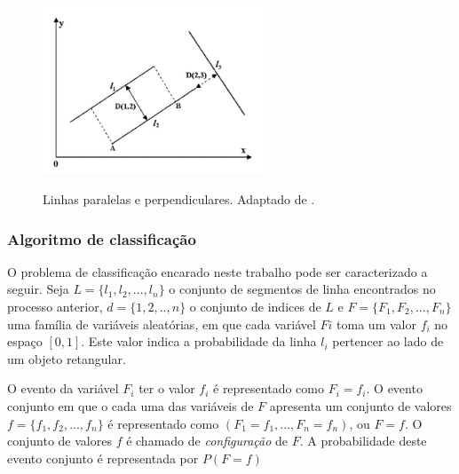 
\begin{figure} [h]
\centering
\includegraphics[width = 0.6\textwidth]{figuras/linhasparal.jpg} \label{uelinha} \caption{Linhas paralelas e perpendiculares. Adaptado de \cite{mrf}.}
\end{figure} 




\subsubsection{Algoritmo de classificação}

O problema de classificação encarado neste trabalho pode ser caracterizado a seguir. Seja $L = \{l_1,l_2,...,l_n\}$ o conjunto de segmentos de linha encontrados no processo anterior, $d = \{1,2,..,n\}$ o conjunto de indices de $L$ e $F = \{F_1,F_2,...,F_n\}$ uma família de variáveis aleatórias, em que cada variável $Fi$ toma um valor $f_i$ no espaço $[0,1]$. Este valor indica a probabilidade da linha $l_i$ pertencer ao lado de um objeto retangular.

O evento da variável $F_i$ ter o valor $f_i$ é representado como $F_i = f_i$. O evento conjunto em que o cada uma das variáveis de $F$ apresenta um conjunto de valores $ f = \{f_1,f_2,...,f_n\} $ é representado como $(F_1=f_1,...,F_n=f_n)$, ou $F = f$. O conjunto de valores $f$ é chamado de \textit{configuração} de $F$. A probabilidade deste evento conjunto é representada por $P(F=f)$

